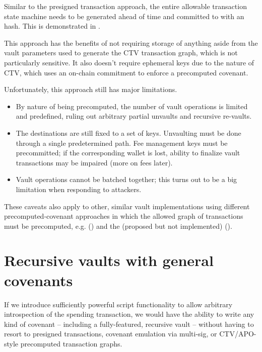 \documentclass[10pt]{article}
\begin{document}
Similar to the presigned transaction approach, the entire allowable transaction
state machine needs to be generated ahead of time and committed to with an \ctv{} hash. 
This is demonstrated in \cite{OBeirne}.

This approach has the benefits of not requiring storage of anything aside from the vault
parameters used to generate the CTV transaction graph, which is not particularly
sensitive. It also doesn't require ephemeral keys due to the nature of CTV, which uses
an on-chain commitment to enforce a precomputed covenant.

Unfortunately, this approach still has major limitations. 

\begin{itemize}

  \item By nature of being precomputed, the number of
    vault operations is limited and predefined, ruling out arbitrary partial
    unvaults and recursive re-vaults. 

  \item The destinations are still fixed to a set of keys. Unvaulting
    must be done through a single predetermined path. Fee management keys must be
    precommitted; if the corresponding wallet is lost, ability to finalize vault 
    transactions may be impaired (more on fees later). 

  \item Vault operations cannot be batched together; this turns out to be a big
    limitation when responding to attackers.

\end{itemize}

These caveats also apply to other, similar vault implementations using different
precomputed-covenant approaches in which the allowed graph of transactions must be
precomputed, e.g.  (\cite{APOVaults}) and the (proposed but not implemented)
 (\cite{OPTX}).

\section*{Recursive vaults with general covenants}

If we introduce sufficiently powerful script functionality to allow arbitrary
introspection of the spending transaction, we would have the ability to write any kind
of covenant -- including a fully-featured, recursive vault -- without having to resort
to presigned transactions, covenant emulation via multi-sig, or CTV/APO-style precomputed
transaction graphs.
\end{document}
